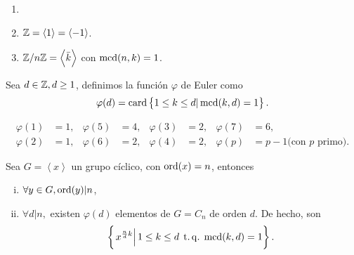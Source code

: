 \begin{example}
    \begin{enumerate}[1.]
        \item[]
        \item $\mathbb{Z} = \left< 1 \right> = \left< -1 \right>$.
        \item $\mathbb{Z}/n\mathbb{Z} = \left< \bar{k} \right>$ con $\operatorname{mcd}(n, k) = 1$.
    \end{enumerate}
\end{example}

\begin{defi}
    Sea $d \in \mathbb{Z}, d \geq 1$, definimos la función $\varphi$ de Euler como
    \[
        \varphi(d) = \operatorname{card} \left\{ 1 \leq k \leq d \vert \operatorname{mcd}(k, d) = 1\right\}.
    \]
\end{defi}

\begin{example}
    \begin{align*}
        \varphi(1) &= 1, & \varphi(5) &= 4, & \varphi(3) &= 2, & \varphi(7) &= 6, \\
        \varphi(2) &= 1, & \varphi(6) &= 2, & \varphi(4) &= 2, & \varphi(p) &= p-1 \text{(con } p \text{ primo).} 
    \end{align*}
\end{example}

\begin{prop}
    Sea $G = \left< x \right>$ un grupo cíclico, con $\operatorname{ord}(x) = n$, entonces
    \begin{enumerate}[i)]
        \item $\forall y \in G, \operatorname{ord}(y) \vert n$,
        \item $\forall d \vert n,$ existen $\varphi(d)$ elementos de $G = C_n$ de orden $d$. De hecho, son
            \[
                \left\{\left. x^{\frac{n}{d} k} \right\vert 1 \leq k \leq d \operatorname{\;t.q.\;} \operatorname{mcd}(k, d) = 1\right\}.
            \]
    \end{enumerate}
\end{prop}

